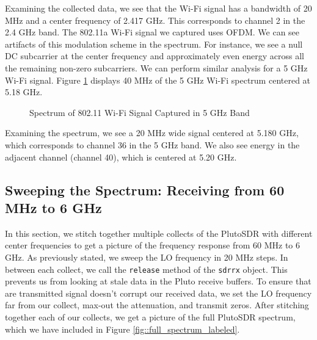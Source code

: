 \documentclass{article}
\begin{document}
Examining the collected data, we see that the Wi-Fi signal has a bandwidth of 20 MHz and a center frequency of 2.417 GHz. This corresponds to channel 2 in the 2.4 GHz band. The 802.11a Wi-Fi signal we captured uses OFDM. We can see artifacts of this modulation scheme in the spectrum. For instance, we see a null DC subcarrier at the center frequency and approximately even energy across all the remaining non-zero subcarriers. We can perform similar analysis for a 5 GHz Wi-Fi signal. Figure \ref{fig::5_180g_wifi_spectrum} displays 40 MHz of the 5 GHz Wi-Fi spectrum centered at 5.18 GHz.

\begin{figure}[H]
	\centerline{}
	\caption{Spectrum of 802.11 Wi-Fi Signal Captured in 5 GHz Band}
	\label{fig::5_180g_wifi_spectrum}
\end{figure}

Examining the spectrum, we see a 20 MHz wide signal centered at 5.180 GHz, which corresponds to channel 36 in the 5 GHz band. We also see energy in the adjacent channel (channel 40), which is centered at 5.20 GHz.

\subsection{Sweeping the Spectrum: Receiving from 60 MHz to 6 GHz}

In this section, we stitch together multiple collects of the PlutoSDR with different center frequencies to get a picture of the frequency response from 60 MHz to 6 GHz. As previously stated, we sweep the LO frequency in 20 MHz steps. In between each collect, we call the \texttt{release} method of the \texttt{sdrrx} object. This prevents us from looking at stale data in the Pluto receive buffers. To ensure that are transmitted signal doesn't corrupt our received data, we set the LO frequency far from our collect, max-out the attenuation, and transmit zeros. After stitching together each of our collects, we get a picture of the full PlutoSDR spectrum, which we have included in Figure \ref{fig::full_spectrum_labeled}.
\end{document}
